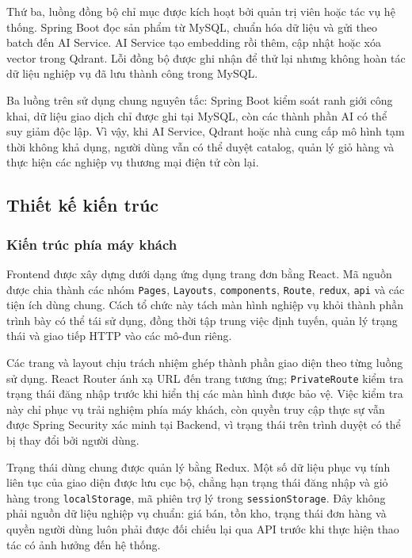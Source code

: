 Thứ ba, luồng đồng bộ chỉ mục được kích hoạt bởi quản trị viên hoặc tác vụ hệ thống. Spring Boot đọc sản phẩm từ MySQL, chuẩn hóa dữ liệu và gửi theo batch đến AI Service. AI Service tạo embedding rồi thêm, cập nhật hoặc xóa vector trong Qdrant. Lỗi đồng bộ được ghi nhận để thử lại nhưng không hoàn tác dữ liệu nghiệp vụ đã lưu thành công trong MySQL.

Ba luồng trên sử dụng chung nguyên tắc: Spring Boot kiểm soát ranh giới công khai, dữ liệu giao dịch chỉ được ghi tại MySQL, còn các thành phần AI có thể suy giảm độc lập. Vì vậy, khi AI Service, Qdrant hoặc nhà cung cấp mô hình tạm thời không khả dụng, người dùng vẫn có thể duyệt catalog, quản lý giỏ hàng và thực hiện các nghiệp vụ thương mại điện tử còn lại.

\subsection{Thiết kế kiến trúc}

\subsubsection{Kiến trúc phía máy khách}

Frontend được xây dựng dưới dạng ứng dụng trang đơn bằng React. Mã nguồn được chia thành các nhóm \texttt{Pages}, \texttt{Layouts}, \texttt{components}, \texttt{Route}, \texttt{redux}, \texttt{api} và các tiện ích dùng chung. Cách tổ chức này tách màn hình nghiệp vụ khỏi thành phần trình bày có thể tái sử dụng, đồng thời tập trung việc định tuyến, quản lý trạng thái và giao tiếp HTTP vào các mô-đun riêng.

Các trang và layout chịu trách nhiệm ghép thành phần giao diện theo từng luồng sử dụng. React Router ánh xạ URL đến trang tương ứng; \texttt{PrivateRoute} kiểm tra trạng thái đăng nhập trước khi hiển thị các màn hình được bảo vệ. Việc kiểm tra này chỉ phục vụ trải nghiệm phía máy khách, còn quyền truy cập thực sự vẫn được Spring Security xác minh tại Backend, vì trạng thái trên trình duyệt có thể bị thay đổi bởi người dùng.

Trạng thái dùng chung được quản lý bằng Redux. Một số dữ liệu phục vụ tính liên tục của giao diện được lưu cục bộ, chẳng hạn trạng thái đăng nhập và giỏ hàng trong \texttt{localStorage}, mã phiên trợ lý trong \texttt{sessionStorage}. Đây không phải nguồn dữ liệu nghiệp vụ chuẩn: giá bán, tồn kho, trạng thái đơn hàng và quyền người dùng luôn phải được đối chiếu lại qua API trước khi thực hiện thao tác có ảnh hưởng đến hệ thống.

